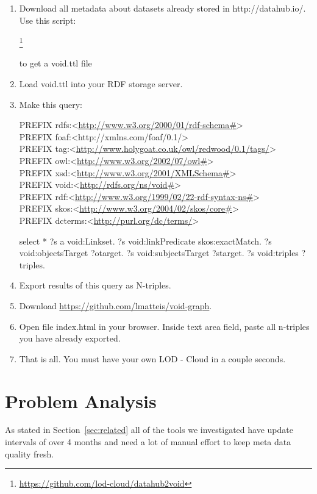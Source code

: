 \documentclass{iosart2c}
\begin{document}
\begin{enumerate}

\item Download all metadata about datasets already stored in http://datahub.io/. Use this script:

\footnote{\url{https://github.com/lod-cloud/datahub2void}}

to get a void.ttl file

\item Load void.ttl into your RDF storage server.

\item Make this query:

PREFIX rdfs:<\url{http://www.w3.org/2000/01/rdf-schema#}> \\
PREFIX foaf:<http://xmlns.com/foaf/0.1/> \\
PREFIX tag:<\url{http://www.holygoat.co.uk/owl/redwood/0.1/tags/}> \\
PREFIX owl:<\url{http://www.w3.org/2002/07/owl#}> \\
PREFIX xsd:<\url{http://www.w3.org/2001/XMLSchema#}> \\
PREFIX void:<\url{http://rdfs.org/ns/void#}> \\
PREFIX rdf:<\url{http://www.w3.org/1999/02/22-rdf-syntax-ns#}> \\
PREFIX skos:<\url{http://www.w3.org/2004/02/skos/core#}> \\
PREFIX dcterms:<\url{http://purl.org/dc/terms/}>

select * { ?s a void:Linkset. ?s void:linkPredicate skos:exactMatch. ?s void:objectsTarget ?otarget. ?s void:subjectsTarget ?starget. ?s void:triples ?triples. }

\item Export results of this query as N-triples.
\item Download \url{https://github.com/lmatteis/void-graph}. 
\item Open file index.html in your browser. Inside text area field, paste all n-triples you have already exported. 

\item That is all. You must have your own LOD - Cloud in a couple seconds. 
\end{enumerate}

\section{Problem Analysis}

As stated in Section~\ref{sec:related} all of the tools we investigated have update intervals of over 4 months and need a lot of manual effort to keep meta data quality fresh.
\end{document}
